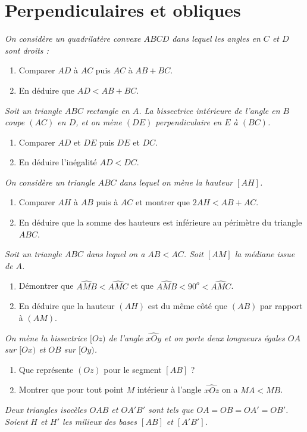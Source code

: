 \chapter{Perpendiculaires et obliques}

\begin{itemize}
\it On considère un quadrilatère convexe $ABCD$ dans lequel les angles en $C$ et $D$ sont droits : 
\begin{enumerate}
\item Comparer $AD$ à $AC$ puis $AC$ à $AB+BC$.
\item En déduire que $AD<AB+BC$.
\end{enumerate}
\it Soit un triangle $ABC$ rectangle en $A$. La bissectrice intérieure de l'angle en $B$ coupe $(AC)$ en $D$, et on mène $(DE)$ perpendiculaire en $E$ à $(BC)$.
\begin{enumerate}
\item Comparer $AD$ et $DE$ puis $DE$ et $DC$. 
\item En déduire l'inégalité $AD<DC$. 
\end{enumerate}
\it On considère un triangle $ABC$ dans lequel on mène la hauteur $[AH]$.\begin{enumerate}
\item Comparer $AH$ à $AB$ puis à $AC$ et montrer que $2AH<AB+AC$.
\item En déduire que la somme des hauteurs est inférieure au périmètre du triangle $ABC$.
\end{enumerate}
\it Soit un triangle $ABC$ dans lequel on a $AB<AC$. Soit $[AM]$ la médiane issue de $A$. 
\begin{enumerate}
\item Démontrer que $\widehat{AMB}<\widehat{AMC}$ et que $\widehat{AMB}<90^o<\widehat{AMC}$.
\item En déduire que la hauteur $(AH)$ est du même côté que $(AB)$ par rapport à $(AM)$.
\end{enumerate}
\it On mène la bissectrice $[Oz)$ de l'angle $\widehat{xOy}$ et on porte deux longueurs égales 
$OA$ sur $[Ox)$ et $OB$ sur $[Oy)$.
\begin{enumerate}
\item Que représente $(Oz)$ pour le segment $[AB]$ ?
\item Montrer que pour tout point $M$ intérieur à l'angle $\widehat{xOz}$ on a $MA<MB$.
\end{enumerate}
\it Deux triangles isocèles $OAB$ et $OA'B'$ sont tels que $OA=OB=OA'=OB'$. Soient $H$ et $H'$ les milieux des bases $[AB]$ et $[A'B']$.

\end{itemize}
